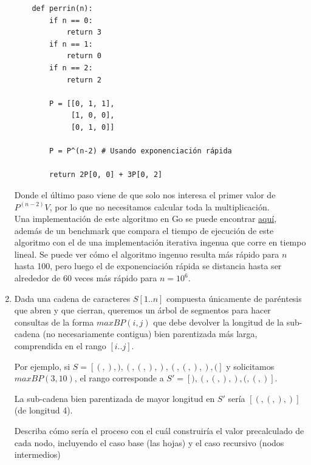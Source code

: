 \documentclass[letterpaper, 12pt]{article}
\begin{document}
\begin{enumerate}
\begin{verbatim}
    def perrin(n):
        if n == 0:
            return 3
        if n == 1:
            return 0
        if n == 2:
            return 2

        P = [[0, 1, 1],
             [1, 0, 0],
             [0, 1, 0]]

        P = P^(n-2) # Usando exponenciación rápida

        return 2P[0, 0] + 3P[0, 2]
\end{verbatim}

Donde el último paso viene de que solo nos interesa el primer valor de $P^{(n-2)}V$, por lo que no necesitamos calcular toda la multiplicación. \\

Una implementación de este algoritmo en Go se puede encontrar \href{}{aquí}, además de un benchmark que compara el tiempo de ejecución de este algoritmo con el de una implementación iterativa ingenua que corre en tiempo lineal. Se puede ver cómo el algoritmo ingenuo resulta más rápido para $n$ hasta 100, pero luego el de exponenciación rápida se distancia hasta ser alrededor de 60 veces más rápido para $n=10^6$.


\item Dada una cadena de caracteres $S[1..n]$ compuesta únicamente de paréntesis que abren y que cierran, queremos un árbol de segmentos para hacer consultas de la forma $maxBP(i, j)$ que debe devolver la longitud de la sub-cadena (no necesariamente contigua) bien parentizada más larga, comprendida en el rango $[i..j]$.

Por ejemplo, si $S = [(, ), ), (, (, ), ), (, (, ), ), (]$ y solicitamos $maxBP(3, 10)$, el rango corresponde a $S' = [), (, (, ), ), (, (, )]$.

La sub-cadena bien parentizada de mayor longitud en $S'$ sería $[(, (, ), )]$ (de longitud 4).

Describa cómo sería el proceso con el cuál construiría el valor precalculado de cada nodo,
incluyendo el caso base (las hojas) y el caso recursivo (nodos intermedios)

\end{enumerate} \vspace{4mm}
\end{document}

